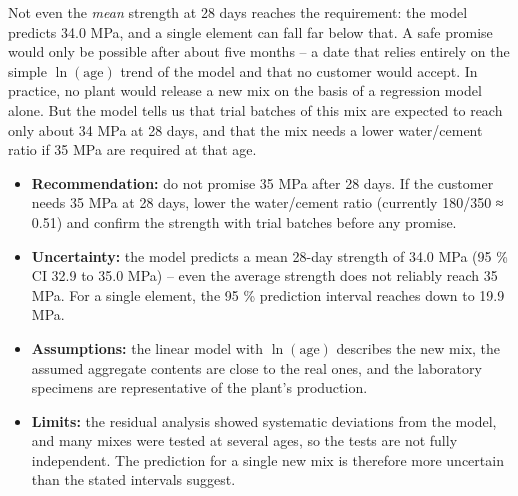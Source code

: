 \documentclass[
  letterpaper,
  DIV=11,
  numbers=noendperiod]{scrreprt}
\providecommand{\tightlist}{%
  \setlength{\itemsep}{0pt}\setlength{\parskip}{0pt}}\usepackage{longtable,booktabs,array}
\begin{document}
Not even the \emph{mean} strength at 28 days reaches the requirement:
the model predicts 34.0 MPa, and a single element can fall far below
that. A safe promise would only be possible after about five months -- a
date that relies entirely on the simple \(\ln(\text{age})\) trend of the
model and that no customer would accept. In practice, no plant would
release a new mix on the basis of a regression model alone. But the
model tells us that trial batches of this mix are expected to reach only
about 34 MPa at 28 days, and that the mix needs a lower water/cement
ratio if 35 MPa are required at that age.

\begin{tcolorbox}[enhanced jigsaw, left=2mm, title=\textcolor{quarto-callout-important-color}{\faExclamation}\hspace{0.5em}{Recommendation to the production manager}, opacityback=0, breakable, rightrule=.15mm, arc=.35mm, toptitle=1mm, colbacktitle=quarto-callout-important-color!10!white, opacitybacktitle=0.6, coltitle=black, colframe=quarto-callout-important-color-frame, bottomrule=.15mm, leftrule=.75mm, bottomtitle=1mm, titlerule=0mm, toprule=.15mm, colback=white]

\begin{itemize}
\tightlist
\item
  \textbf{Recommendation:} do not promise 35 MPa after 28 days. If the
  customer needs 35 MPa at 28 days, lower the water/cement ratio
  (currently 180/350 ≈ 0.51) and confirm the strength with trial batches
  before any promise.
\item
  \textbf{Uncertainty:} the model predicts a mean 28-day strength of
  34.0 MPa (95 \% CI 32.9 to 35.0 MPa) -- even the average strength does
  not reliably reach 35 MPa. For a single element, the 95 \% prediction
  interval reaches down to 19.9 MPa.
\item
  \textbf{Assumptions:} the linear model with \(\ln(\text{age})\)
  describes the new mix, the assumed aggregate contents are close to the
  real ones, and the laboratory specimens are representative of the
  plant's production.
\item
  \textbf{Limits:} the residual analysis showed systematic deviations
  from the model, and many mixes were tested at several ages, so the
  tests are not fully independent. The prediction for a single new mix
  is therefore more uncertain than the stated intervals suggest.
\end{itemize}

\end{tcolorbox}
\end{document}
